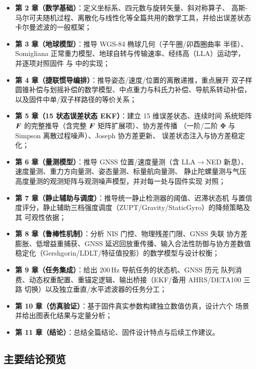 \begin{itemize}
  \item \textbf{第 2 章（数学基础）}：定义坐标系、四元数与旋转矢量、斜对称算子、
    高斯-马尔可夫随机过程、离散化与线性化等全篇共用的数学工具，并给出误差状态
    卡尔曼滤波的一般框架；
  \item \textbf{第 3 章（地球模型）}：推导 WGS-84 椭球几何（子午圈/卯酉圈曲率
    半径）、Somigliana 正常重力模型、地球自转与传输速率、经纬高（LLA）运动学，
    并逐项对照固件  与  中的实现；
  \item \textbf{第 4 章（捷联惯导编排）}：推导姿态/速度/位置的离散递推，重点展开
    双子样圆锥补偿与划摇补偿的数学模型、中点重力与科氏力补偿、导航系转动补偿，
    以及固件中单/双子样路径的等价关系；
  \item \textbf{第 5 章（15 状态误差状态 EKF）}：建立 15 维误差状态、连续时间
    系统矩阵 $\boldsymbol{F}$ 的完整推导（含完整 $\boldsymbol{F}$ 矩阵扩展项）、协方差传播
    （一阶/二阶 $\bm{\Phi}$ 与 Simpson 离散过程噪声）、Joseph 协方差更新、
    误差状态注入与协方差稳定化；
  \item \textbf{第 6 章（量测模型）}：推导 GNSS 位置/速度量测（含
    LLA$\rightarrow$NED 新息）、速度量测、重力方向量测、姿态量测、标量航向量测、
    静止陀螺量测与气压高度量测的观测矩阵与观测噪声模型，并对每一处与固件实现
    对照；
  \item \textbf{第 7 章（静止辅助与调度）}：推导统一静止检测器的阈值、迟滞状态机
    与置信度评分，静止辅助三档强度调度（ZUPT/Gravity/StaticGyro）的降频策略及其
    可观性依据；
  \item \textbf{第 8 章（鲁棒性机制）}：分析 NIS 门控、物理残差门限、GNSS 失联
    协方差膨胀、低增益重捕获、GNSS 延迟回放重传播、输入合法性防御与协方差数值
    稳定化（Gershgorin/LDLT/特征值投影）的数学模型与设计权衡；
  \item \textbf{第 9 章（任务集成）}：给出 200\,Hz 导航任务的状态机、GNSS 历元
    队列消费、动态权重配置、重锚定逻辑、输出桥接（EKF/备用 AHRS/DETA100 三路
    切换）以及独立垂直/水平滤波器的任务分工；
  \item \textbf{第 10 章（仿真验证）}：基于固件真实参数构建独立数值仿真，设计六个
    场景并给出图表化结果与定量分析；
  \item \textbf{第 11 章（结论）}：总结全篇结论、固件设计特点与后续工作建议。
\end{itemize}

\subsection{主要结论预览}

